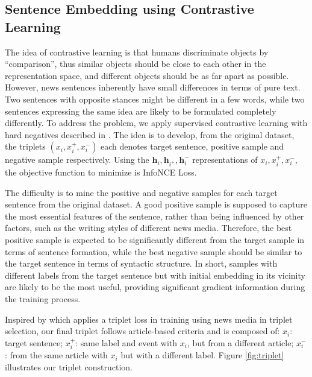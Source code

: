 \subsection{Sentence Embedding using Contrastive Learning}

The idea of contrastive learning is that humans discriminate objects by ``comparison'', thus similar objects should be close to each other in the representation space, and different objects should be as far apart as possible. However, news sentences inherently have small differences in terms of pure text. Two sentences with opposite stances might be different in a few words, while two sentences expressing the
same idea are likely to be formulated completely differently. To address the problem, we apply supervised contrastive learning with hard negatives described in \citet{gao2021simcse}. The idea is to develop, from the original dataset, the triplets $(x_i,x^+_i,x^-_i)$  each denotes target sentence, positive sample and negative sample respectively. Using the $\mathbf{h}_{i},\mathbf{h}_{i^+},\mathbf{h}_{i}^-$ representations of $x_i,x^+_i,x^-_i$, 
the objective function to minimize is InfoNCE Loss. 


The difficulty is to mine the positive and negative samples for each target sentence from the original dataset. A good positive sample is supposed to capture the most essential features of the sentence, rather than being influenced by other factors, such as the writing styles of different news media. Therefore, the best positive sample is expected to be significantly different from the target sample in terms of sentence formation, while the best negative sample should be similar to the target sentence in terms of syntactic structure. In short, samples with different labels from the target sentence but with initial embedding in its vicinity are likely to be the most useful, providing significant gradient information during the training process.

Inspired by \citet{baly-etal-2020-detect} which applies a triplet loss in training using news media in triplet selection, our final triplet follows article-based criteria and is composed of: $x_i$: target sentence; $x_i^+$: same label and event with $x_i$, but from a different article; $x_i^-$: from the same article with $x_i$ but with a different label. Figure \ref{fig:triplet} illustrates our triplet construction.


